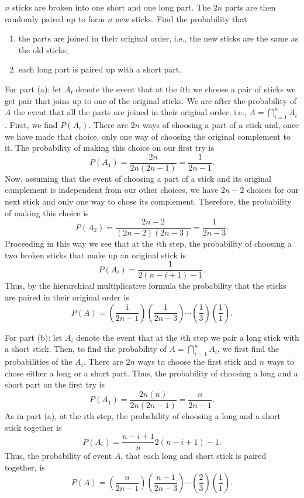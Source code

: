 \begin{problem}[Handout 3, \# 3]
  \(n\) sticks are broken into one short and one long part. The \(2n\)
  parts are then randomly paired up to form \(n\) new sticks. Find the
  probability that
  \begin{enumerate}[label=(\alph*),noitemsep]
  \item the parts are joined in their original order, i.e., the new sticks
    are the same as the old sticks;
  \item each long part is paired up with a short part.
  \end{enumerate}
\end{problem}
\begin{solution}
  For part (a): let \(A_i\) denote the event that at the \(i\)th we choose
  a pair of sticks we get pair that joins up to one of the original
  sticks. We are after the probability of \(A\) the event that all the
  parts are joined in their original order, i.e.,
  \(A=\bigcap_{i=1}^n A_i\). First, we find \(P(A_i)\). There are \(2n\)
  ways of choosing a part of a stick and, once we have made that choice,
  only one way of choosing the original complement to it. The probability
  of making this choice on our first try is
  \[
    P(A_1)=\frac{2n}{2n(2n-1)}=\frac{1}{2n-1}.
  \]
  Now, assuming that the event of choosing a part of a stick and its
  original complement is independent from our other choices, we have
  \(2n-2\) choices for our next stick and only one way to chose its
  complement. Therefore, the probability of making this choice is
  \[
    P(A_2)=\frac{2n-2}{(2n-2)(2n-3)}=\frac{1}{2n-3}.
  \]
  Proceeding in this way we see that at the \(i\)th step, the probability
  of choosing a two broken sticks that make up an original stick is
  \[
    P(A_i)=\frac{1}{2(n-i+1)-1}.
  \]
  Thus, by the hierarchical multiplicative formula the probability that the
  sticks are paired in their original order is
  \[
    P(A)=\left(\frac{1}{2n-1}\right)\left(\frac{1}{2n-3}\right) \dotsm
    \left(\frac{1}{3}\right)\left(\frac{1}{1}\right).
  \]

  For part (b): let \(A_i\) denote the event that at the \(i\)th step we
  pair a long stick with a short stick. Then, to find the probability of
  \(A=\bigcap_{i=1}^n A_i\), we first find the probabilities of the
  \(A_i\). There are \(2n\) ways to choose the first stick and \(n\) ways
  to chose either a long or a short part. Thus, the probability of choosing
  a long and a short part on the first try is
  \[
    P(A_1)=\frac{2n(n)}{2n(2n-1)}=\frac{n}{2n-1}.
  \]
  As in part (a), at the \(i\)th step, the probability of choosing a long
  and a short stick together is
  \[
    P(A_i)=\frac{n-i+1}n{2(n-i+1)-1}.
  \]
  Thus, the probability of event \(A\), that each long and short stick is
  paired together, is
  \[
    P(A)=\left(\frac{n}{2n-1}\right)\left(\frac{n-1}{2n-3}\right)\dotsm
    \left(\frac{2}{3}\right)\left(\frac{1}{1}\right).
  \]
\end{solution}
